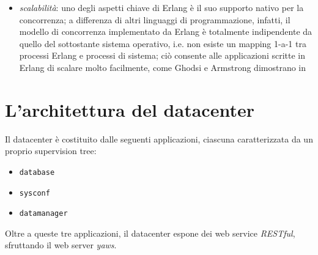 \begin{itemize}
      elevato grado di \emph{reliability} e \emph{fault tolerance}\cite{armstrongreliability}
%
\item \emph{scalabilit\`a}: uno degli aspetti chiave di Erlang \`e il suo supporto nativo 
      per la concorrenza; a differenza di altri linguaggi di programmazione, 
      infatti, il modello di concorrenza  implementato da Erlang \`e totalmente indipendente da 
      quello del sottostante sistema operativo, i.e. non esiste un mapping 1-a-1 tra processi 
      Erlang e processi di sistema; ci\`o consente alle applicazioni scritte in Erlang di 
      scalare molto facilmente, come Ghodsi e Armstrong dimostrano in \cite{armstrongyaws}
\end{itemize}
%

\section{L'architettura del datacenter}
\label{datacenter-arch}
%
Il datacenter \`e costituito dalle seguenti applicazioni, ciascuna caratterizzata da un 
proprio supervision tree:
%
\begin{itemize}
\item \texttt{database}
\item \texttt{sysconf}
\item \texttt{datamanager}
\end{itemize}
%
Oltre a queste tre applicazioni, il datacenter espone dei web service \emph{RESTful}, 
sfruttando il web server \emph{yaws}\cite{yaws}.
%

%
